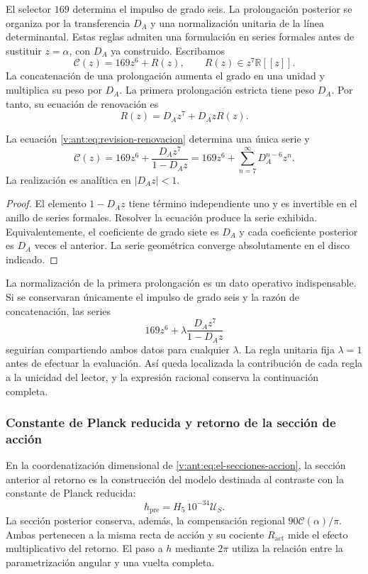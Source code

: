 El selector \(169\) determina el impulso de grado seis. La prolongación
posterior se organiza por la transferencia \(D_A\) y una normalización
unitaria de la línea determinantal. Estas reglas admiten una formulación
en series formales antes de sustituir \(z=\alpha\), con \(D_A\) ya
construido. Escribamos
\[
 \mathscr C(z)=169z^6+R(z),\qquad R(z)\in z^7\mathbb R[[z]].
\]
La concatenación de una prolongación aumenta el grado en una unidad y
multiplica su peso por \(D_A\). La primera prolongación estricta tiene
peso \(D_A\). Por tanto, su ecuación de renovación es
\begin{equation}
 R(z)=D_Az^7+D_AzR(z).
 \label{v:ant:eq:revision-renovacion}
\end{equation}

\begin{proposition}
La ecuación \eqref{v:ant:eq:revision-renovacion} determina una única serie y
\[
 \mathscr C(z)=169z^6+\frac{D_Az^7}{1-D_Az}
             =169z^6+\sum_{n=7}^{\infty}D_A^{n-6}z^n.
\]
La realización es analítica en \(|D_Az|<1\).
\end{proposition}
\begin{proof}
El elemento \(1-D_Az\) tiene término independiente uno y es invertible
en el anillo de series formales. Resolver la ecuación produce la serie
exhibida. Equivalentemente, el coeficiente de grado siete es \(D_A\)
y cada coeficiente posterior es \(D_A\) veces el anterior. La serie
geométrica converge absolutamente en el disco indicado.
\end{proof}

La normalización de la primera prolongación es un dato operativo
indispensable. Si se conservaran únicamente el impulso de grado seis y
la razón de concatenación, las series
\[
 169z^6+\lambda\frac{D_Az^7}{1-D_Az}
\]
seguirían compartiendo ambos datos para cualquier \(\lambda\).
La regla unitaria fija \(\lambda=1\) antes de efectuar la evaluación.
Así queda localizada la contribución de cada regla a la unicidad del
lector, y la expresión racional conserva la continuación completa.

\subsubsection{Constante de Planck reducida y retorno de la sección de acción}

En la coordenatización dimensional de \eqref{v:ant:eq:el-secciones-accion}, la sección
anterior al retorno es la construcción del modelo destinada al contraste
con la constante de Planck reducida:
\[
 \hbar_{\mathrm{pre}}=H_5\,10^{-34}\mathcal U_S.
\]
La sección posterior conserva, además, la compensación regional
\(90\mathscr C(\alpha)/\pi\). Ambas pertenecen a la misma recta de
acción y su cociente \(R_{\mathrm{act}}\) mide el efecto multiplicativo
del retorno. El paso a \(h\) mediante \(2\pi\) utiliza la relación
entre la parametrización angular y una vuelta completa.
